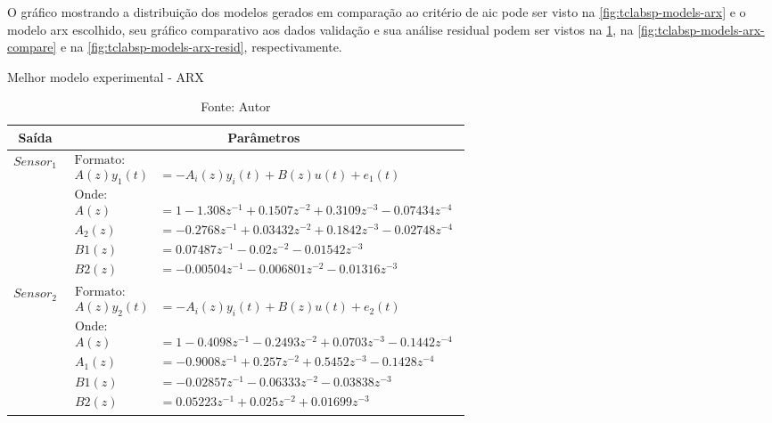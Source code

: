 O gráfico mostrando a distribuição dos modelos gerados em comparação ao critério de \acrshort{aic} pode ser
visto na \cref{fig:tclabsp-models-arx} e o modelo \acrshort{arx} escolhido, seu gráfico comparativo aos dados validação
e sua análise residual podem ser vistos na \cref{tab:tclabsp-model-arx}, na \cref{fig:tclabsp-models-arx-compare} e na
\cref{fig:tclabsp-models-arx-resid}, respectivamente.

\begin{table}[h]
	\centering
	\caption{Melhor modelo experimental - ARX}
	\label{tab:tclabsp-model-arx}
	\begin{tabular}{c|c} \toprule
		{Saída}			&	{Parâmetros}									\\ \midrule
		$Sensor_1$			&
								$ 
									\begin{aligned}
										\text{Formato:}																	\\
										A(z)y_1(t) &= - A_i(z)y_i(t) + B(z)u(t) + e_1(t)								\\
										\text{Onde:}																	\\
										A(z) &= 1 - 1.308 z^{-1} + 0.1507 z^{-2} + 0.3109 z^{-3} - 0.07434 z^{-4}       \\  
										A_2(z) &= -0.2768 z^{-1} + 0.03432 z^{-2} + 0.1842 z^{-3} - 0.02748 z^{-4}      \\  
										B1(z) &= 0.07487 z^{-1} - 0.02 z^{-2} - 0.01542 z^{-3}                      	\\
										B2(z) &= -0.00504 z^{-1} - 0.006801 z^{-2} - 0.01316 z^{-3}    
									\end{aligned}
								$	
							\\ \midrule
		$Sensor_2$			&
								$ 
									\begin{aligned}
										\text{Formato:}																	\\
										A(z)y_2(t) &= - A_i(z)y_i(t) + B(z)u(t) + e_2(t)								\\
										\text{Onde:}																	\\
										A(z) &= 1 - 0.4098 z^{-1} - 0.2493 z^{-2} + 0.0703 z^{-3} - 0.1442 z^{-4}    	\\   
										A_1(z) &= -0.9008 z^{-1} + 0.257 z^{-2} + 0.5452 z^{-3} - 0.1428 z^{-4}  		\\
										B1(z) &= -0.02857 z^{-1} - 0.06333 z^{-2} - 0.03838 z^{-3}          			\\
										B2(z) &= 0.05223 z^{-1} + 0.025 z^{-2} + 0.01699 z^{-3} 		
									\end{aligned}
								$
							\\ \bottomrule
	\end{tabular}
	\caption*{Fonte: Autor}
\end{table}

